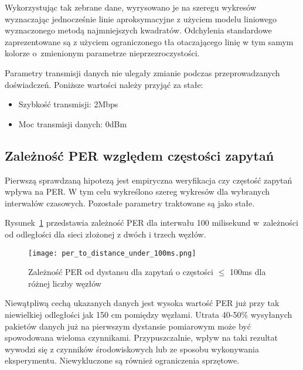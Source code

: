 Wykorzystując tak zebrane dane, wyrysowano je na szeregu wykresów wyznaczając jednocześnie
linie aproksymacyjne z użyciem modelu liniowego wyznaczonego metodą najmniejszych kwadratów. Odchylenia standardowe zaprezentowane
są z użyciem ograniczonego tła otaczającego linię w tym samym kolorze o~zmienionym parametrze nieprzezroczystości.

Parametry transmisji danych nie ulegały zmianie podczas przeprowadzanych doświadczeń. Poniższe wartości należy
przyjąć za stałe:
\begin{itemize}
\item Szybkość transmisji: 2Mbps
\item Moc transmisji danych: 0dBm
\end{itemize}

\subsection{Zależność PER względem częstości zapytań}

Pierwszą sprawdzaną hipotezą jest empiryczna weryfikacja czy częstość zapytań wpływa na \gls{PER}.
W tym celu wykreślono szereg wykresów dla wybranych interwałów czasowych. Pozostałe parametry traktowane są
jako stałe.

Rysunek~\ref{rys:per_to_distance_under_100ms} przedstawia zależność PER dla interwału 100 milisekund w~zależności
od odległości dla sieci złożonej z dwóch i trzech węzłów. 

\begin{figure}[!htb]
	\centering \texttt{[image: per\_to\_distance\_under\_100ms.png]}
	\caption{Zależność \gls{PER} od dystansu dla zapytań o częstości $\leqslant$ 100ms dla różnej liczby węzłów}
	\label{rys:per_to_distance_under_100ms}
\end{figure}

Niewątpliwą cechą ukazanych danych jest wysoka wartość PER już przy tak niewielkiej odległości jak 150 cm pomiędzy węzłami.
Utrata 40-50\% wysyłanych pakietów danych już na pierwszym dystansie pomiarowym może być spowodowana wieloma czynnikami.
Przypuszczalnie, wpływ na taki rezultat wywodzi się z czynników środowiskowych lub ze sposobu wykonywania 
eksperymentu. Niewykluczone są również ograniczenia sprzętowe.

